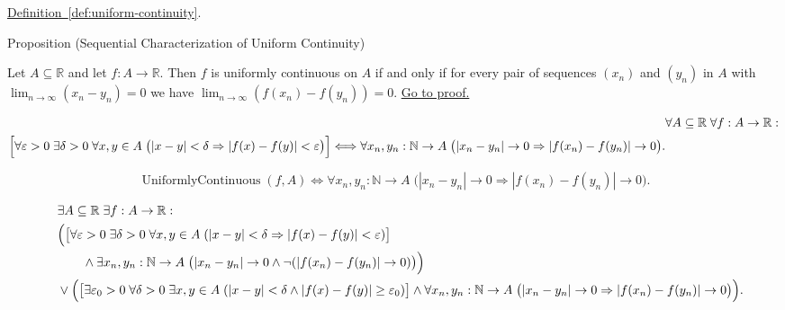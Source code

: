 \begin{dependencies}
\hyperref[def:uniform-continuity]{Definition~\ref*{def:uniform-continuity}}.
\end{dependencies}


\begin{propositionbox}{Proposition (Sequential Characterization of Uniform Continuity)}
\begin{proposition}
\label{prop:sequential-uniform-continuity}
Let $A \subseteq \mathbb{R}$ and let $f:A \to \mathbb{R}$. Then $f$ is uniformly continuous on $A$ if and only if for every pair of sequences $(x_n)$ and $(y_n)$ in $A$ with $\lim_{n \to \infty} (x_n - y_n) = 0$ we have $\lim_{n \to \infty} (f(x_n) - f(y_n)) = 0$.
\hyperref[prf:sequential-uniform-continuity]{Go to proof.}
\end{proposition}
\end{propositionbox}

\begin{remark*}
\[
\begin{aligned}
&\forall A \subseteq \mathbb{R}\;\forall f:A \to \mathbb{R}:\\
\Bigl[\forall \varepsilon>0\;\exists \delta>0\;\forall x,y\in A\;
\bigl(|x-y|<\delta\Rightarrow |f(x)-f(y)|<\varepsilon\bigr)\Bigr]
\Longleftrightarrow
\forall x_n,y_n:\mathbb{N} \to A\;
\bigl(|x_n - y_n| \to 0 \Rightarrow |f(x_n) - f(y_n)| \to 0\bigr).
\end{aligned}
\]
\end{remark*}

\begin{remark*}
\[
\operatorname{UniformlyContinuous}(f,A)
\Longleftrightarrow
\forall x_n,y_n:\mathbb{N} \to A\;
\bigl(|x_n - y_n| \to 0 \Rightarrow |f(x_n) - f(y_n)| \to 0\bigr).
\]
\end{remark*}

\begin{remark*}
\[
\begin{aligned}
&\exists A \subseteq \mathbb{R}\;\exists f:A \to \mathbb{R}:\\
\quad &\Bigl(
\bigl[\forall \varepsilon>0\;\exists \delta>0\;\forall x,y\in A\;
(|x-y|<\delta\Rightarrow |f(x)-f(y)|<\varepsilon)\bigr]\\
&\qquad\land \exists x_n,y_n:\mathbb{N}\to A\;
\bigl(|x_n - y_n| \to 0 \land \neg(|f(x_n) - f(y_n)| \to 0)\bigr)\Bigr)\\
\quad &\lor \Bigl(
\bigl[\exists \varepsilon_0>0\;\forall \delta>0\;\exists x,y\in A\;
(|x-y|<\delta\land |f(x)-f(y)|\ge\varepsilon_0)\bigr]\land
\forall x_n,y_n:\mathbb{N}\to A\;
\bigl(|x_n - y_n| \to 0 \Rightarrow |f(x_n) - f(y_n)| \to 0\bigr)\Bigr).
\end{aligned}
\]
\end{remark*}

